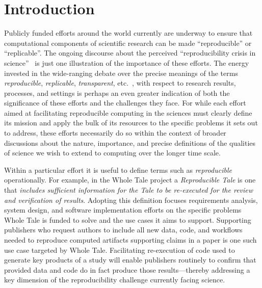 
\section{Introduction}

Publicly funded efforts around the world currently are underway to
	ensure that computational components of scientific research
	can be made ``reproducible'' or ``replicable''.
The ongoing discourse about the perceived ``reproducibility crisis in science''~\cite{donoho_reproducible_2009,baker_2016,fanelli_opinion:_2018}
	is just one illustration of the importance of these efforts.
The energy invested in the wide-ranging debate over the precise meanings of the
	terms \emph{reproducible}, \emph{replicable},
        \emph{transparent}, etc.\
        \cite{drummond2009replicability,carolegoble2016what,freire2016reproducibilitya,goodman2016what,ioannidis2017reproducibility,herouxtoward,plesser2018reproducibility,barba2018terminologies,committeeonreproducibilityandreplicabilityinscience2019reproducibility}, with
	respect to research results, processes, and settings is perhaps an even greater indication of
	both the significance of these efforts and the challenges they face.
For while each effort aimed at facilitating reproducible computing in the
	sciences must clearly define its mission and apply the bulk of its resources
	to the specific problems it sets out to address, these efforts necessarily do
	so within the context of broader discussions about the nature, importance,
	and precise definitions of the qualities of science we wish to extend to computing
	over the longer time scale.

Within a particular effort it is useful to define terms such as \emph{reproducible} operationally.
For example, in the Whole Tale project \cite{WT2019,brinckman2019computing} a \emph{Reproducible Tale} is one
	that \emph{includes sufficient information for the Tale to be re-executed for the review
	and verification of results}.
Adopting this definition focuses requirements analysis, system design,
	and software implementation efforts on the specific problems Whole Tale is funded to solve
	and the use cases it aims to support.
Supporting publishers who request authors to include all new data,
	code, and workflows needed to reproduce computed artifacts supporting
	claims in a paper is one such use case targeted by Whole Tale.
Facilitating re-execution of code used to generate
	key products of a study will enable publishers routinely to confirm that
	provided data and code do in fact produce those results---thereby addressing
	a key dimension of the reproducibility challenge currently facing science.

